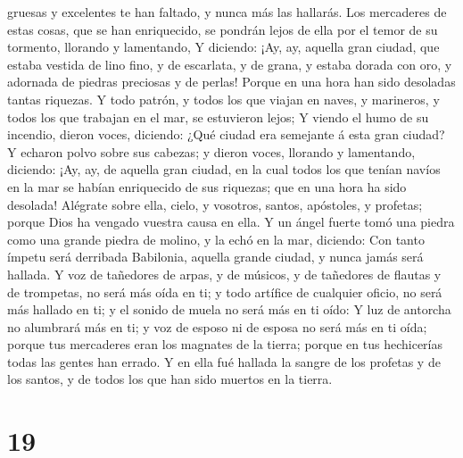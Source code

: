 gruesas y excelentes te han faltado, y nunca más las hallarás.
 Los mercaderes de estas cosas, que se han enriquecido,
se pondrán lejos de ella por el temor de su tormento, llorando y
lamentando,  Y diciendo: ¡Ay, ay, aquella gran ciudad,
que estaba vestida de lino fino, y de escarlata, y de grana, y estaba
dorada con oro, y adornada de piedras preciosas y de perlas!
 Porque en una hora han sido desoladas tantas riquezas. Y
todo patrón, y todos los que viajan en naves, y marineros, y todos los
que trabajan en el mar, se estuvieron lejos;  Y viendo el
humo de su incendio, dieron voces, diciendo: ¿Qué ciudad era semejante á
esta gran ciudad?  Y echaron polvo sobre sus cabezas; y
dieron voces, llorando y lamentando, diciendo: ¡Ay, ay, de aquella gran
ciudad, en la cual todos los que tenían navíos en la mar se habían
enriquecido de sus riquezas; que en una hora ha sido desolada!
 Alégrate sobre ella, cielo, y vosotros, santos,
apóstoles, y profetas; porque Dios ha vengado vuestra causa en ella.
 Y un ángel fuerte tomó una piedra como una grande piedra
de molino, y la echó en la mar, diciendo: Con tanto ímpetu será
derribada Babilonia, aquella grande ciudad, y nunca jamás será hallada.
 Y voz de tañedores de arpas, y de músicos, y de
tañedores de flautas y de trompetas, no será más oída en ti; y todo
artífice de cualquier oficio, no será más hallado en ti; y el sonido de
muela no será más en ti oído:  Y luz de antorcha no
alumbrará más en ti; y voz de esposo ni de esposa no será más en ti
oída; porque tus mercaderes eran los magnates de la tierra; porque en
tus hechicerías todas las gentes han errado.  Y en ella
fué hallada la sangre de los profetas y de los santos, y de todos los
que han sido muertos en la tierra.

\hypertarget{section-18}{%
\section{19}\label{section-18}}

